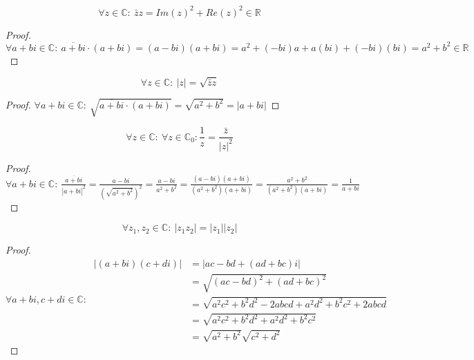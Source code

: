 \documentclass[main.tex]{subfiles}
\begin{document}
\begin{pr}
  \label{pr:normaal-maal-toegevoegde-in-r}
  \[ \forall z\in \mathbb{C}:\ \bar{z}z = Im(z)^{2}+Re(z)^{2} \in \mathbb{R} \]

  \begin{proof}
    $\forall a+bi\in \mathbb{C}:\  \overline{a+bi}\cdot(a+bi) = (a-bi)(a+bi) = a^{2} + (-bi)a + a(bi) + (-bi)(bi) = a^{2} + b^{2} \in \mathbb{R}$
  \end{proof}
\end{pr}

\begin{pr}
  \label{pr:modulus-in-termen-van-toegevoegde}
  \[ \forall z\in \mathbb{C}:\ |z| = \sqrt{\bar{z}z} \]

  \begin{proof}
    $\forall a+bi\in \mathbb{C}:\ \sqrt{\overline{a+bi}\cdot(a+bi)} = \sqrt{a^{2}+b^{2}} = |a+bi|$
  \end{proof}
\end{pr}

\begin{pr}
  \[ \forall z\in \mathbb{C}:\ \forall z \in \mathbb{C}_{0}: \frac{1}{z} = \frac{\bar{z}}{|z|^{2}} \]

  \begin{proof}
    $\forall a+bi\in \mathbb{C}:\ \frac{\overline{a+bi}}{|a+bi|^{2}} = \frac{a-bi}{\left(\sqrt{a^{2}+b^{2}}\right)^{2}} = \frac{a-bi}{a^{2}+b^{2}}= \frac{(a-bi)(a+bi)}{(a^{2}+b^{2})(a+bi)} = \frac{a^{2}+b^{2}}{(a^{2}+b^{2})(a+bi)} = \frac{1}{a+bi}$
  \end{proof}
\end{pr}

\begin{pr}
  \[ \forall z_{1},z_{2}\in \mathbb{C}:\ |z_{1}z_{2}| = |z_{1}||z_{2}| \]

  \begin{proof}
    \[
    \forall a+bi,c+di \in \mathbb{C}:\
    \begin{array}{rll}
      |(a+bi)(c+di)| &= |ac-bd + (ad+bc)i|\\
      &= \sqrt{(ac-bd)^{2} + (ad+bc)^{2}}\\
      &= \sqrt{a^{2}c^{2} +b^{2}d^{2}-2abcd + a^{2}d^{2} + b^{2}c^{2} +2abcd}\\
      &= \sqrt{a^{2}c^{2} +b^{2}d^{2} + a^{2}d^{2} + b^{2}c^{2}}\\
      &= \sqrt{a^{2}+b^{2}}\sqrt{c^{2}+d^{2}}
    \end{array}
    \]
  \end{proof}
\end{pr}
\end{document}
